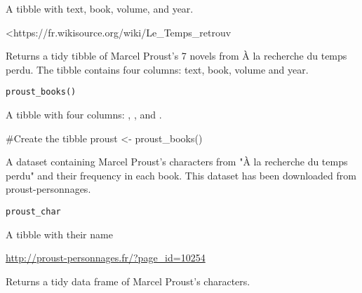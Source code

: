 \documentclass[a4paper]{book}
\begin{document}
%
\begin{Format}
A tibble with text, book, volume, and year.
\end{Format}
%
\begin{Source}\relax
<https://fr.wikisource.org/wiki/Le\_Temps\_retrouv
\end{Source}
%
\begin{Description}\relax
Returns a tidy tibble of Marcel Proust's 7 novels from À la recherche du temps
perdu. The tibble contains four columns: text, book, volume and year.
\end{Description}
%
\begin{Usage}
\begin{verbatim}
proust_books()
\end{verbatim}
\end{Usage}
%
\begin{Value}
A tibble with four columns: , ,  and .
\end{Value}
%
\begin{Examples}
\begin{ExampleCode}

#Create the tibble 
proust <- proust_books()
 

\end{ExampleCode}
\end{Examples}
%
\begin{Description}\relax
A dataset containing Marcel Proust's characters from "À la recherche du temps perdu"  and 
their frequency in each book. 
This dataset has been downloaded from proust-personnages.
\end{Description}
%
\begin{Usage}
\begin{verbatim}
proust_char
\end{verbatim}
\end{Usage}
%
\begin{Format}
A tibble with their name
\end{Format}
%
\begin{Source}\relax
\url{http://proust-personnages.fr/?page_id=10254}
\end{Source}
%
\begin{Description}\relax
Returns a tidy data frame of Marcel Proust's characters.
\end{Description}
\end{document}
